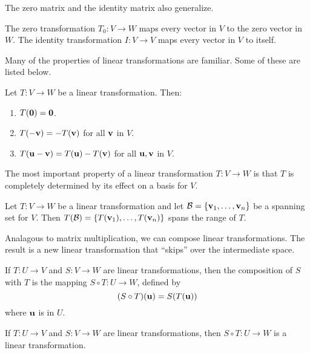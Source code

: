 \documentclass[../m73main.tex]{subfiles}
\begin{document}
The zero matrix and the identity matrix also generalize.

\begin{definition}
	The zero transformation $T_0 : V \to W$ maps every vector in $V$ to the zero vector in $W$.
	The identity transformation $I : V \to V$ maps every vector in $V$ to itself.
\end{definition}

Many of the properties of linear transformations are familiar.
Some of these are listed below.

\begin{theorem}
	Let $T : V \to W$ be a linear transformation.
	Then:
	\begin{enumerate}[label=(\alph*)]
		\item $T(\mathbf{0}) = \mathbf{0}$.
		\item $T(-\mathbf{v}) = -T(\mathbf{v})$ for all $\mathbf{v}$ in $V$.
		\item $T(\mathbf{u} - \mathbf{v}) = T(\mathbf{u}) - T(\mathbf{v})$ for all $\mathbf{u}, \mathbf{v}$ in $V$.
	\end{enumerate}
\end{theorem}

The most important property of a linear transformation $T : V \to W$ is that $T$ is completely determined by its effect on a basis for $V$.

\begin{theorem}
	Let $T : V \to W$ be a linear transformation and let $\mathcal{B} = \{\mathbf{v}_1, \ldots, \mathbf{v}_n\}$ be a spanning set for $V$.
	Then $T(\mathcal{B}) = \{T(\mathbf{v}_1), \ldots, T(\mathbf{v}_n)\}$ spans the range of $T$.
\end{theorem}

Analagous to matrix multiplication, we can compose linear transformations.
The result is a new linear transformation that ``skips'' over the intermediate space.

\begin{definition}
	If $T : U \to V$ and $S : V \to W$ are linear transformations, then the composition of $S$ with $T$ is the mapping $S \circ T : U \to W$, defined by
	\[ (S \circ T)(\mathbf{u}) = S(T(\mathbf{u})) \]
	where $\mathbf{u}$ is in $U$.
\end{definition}

\begin{theorem}
	If $T : U \to V$ and $S : V \to W$ are linear transformations, then $S \circ T : U \to W$ is a linear transformation.
\end{theorem}
\end{document}
